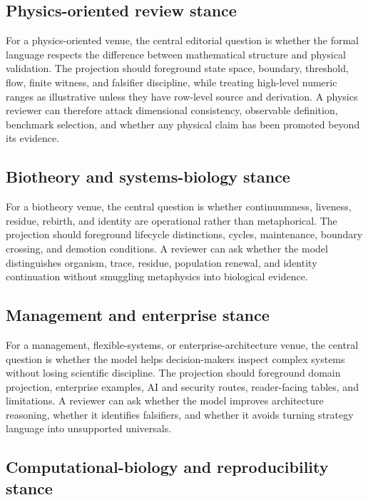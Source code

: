 \subsection{Physics-oriented review stance}

For a physics-oriented venue, the central editorial question is whether the
formal language respects the difference between mathematical structure and
physical validation. The projection should foreground state space, boundary,
threshold, flow, finite witness, and falsifier discipline, while treating
high-level numeric ranges as illustrative unless they have row-level source and
derivation. A physics reviewer can therefore attack dimensional consistency,
observable definition, benchmark selection, and whether any physical claim has
been promoted beyond its evidence.

\subsection{Biotheory and systems-biology stance}

For a biotheory venue, the central question is whether continuumness, liveness,
residue, rebirth, and identity are operational rather than metaphorical. The
projection should foreground lifecycle distinctions, cycles, maintenance,
boundary crossing, and demotion conditions. A reviewer can ask whether the
model distinguishes organism, trace, residue, population renewal, and identity
continuation without smuggling metaphysics into biological evidence.

\subsection{Management and enterprise stance}

For a management, flexible-systems, or enterprise-architecture venue, the
central question is whether the model helps decision-makers inspect complex
systems without losing scientific discipline. The projection should foreground
domain projection, enterprise examples, AI and security routes, reader-facing
tables, and limitations. A reviewer can ask whether the model improves
architecture reasoning, whether it identifies falsifiers, and whether it avoids
turning strategy language into unsupported universals.

\subsection{Computational-biology and reproducibility stance}

